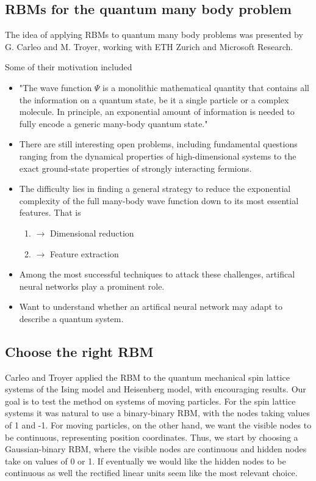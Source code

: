 \documentclass[%
oneside,                 %
final,                   %
10pt]{article}
\begin{document}
\subsection{RBMs for the quantum many body problem}

The idea of applying RBMs to quantum many body problems was presented by G. Carleo and M. Troyer, working with ETH Zurich and Microsoft Research.

Some of their motivation included

\begin{itemize}
\item "The wave function $\Psi$ is a monolithic mathematical quantity that contains all the information on a quantum state, be it a single particle or a complex molecule. In principle, an exponential amount of information is needed to fully encode a generic many-body quantum state."

\item There are still interesting open problems, including fundamental questions ranging from the dynamical properties of high-dimensional systems to the exact ground-state properties of strongly interacting fermions.

\item The difficulty lies in finding a general strategy to reduce the exponential complexity of the full many-body wave function down to its most essential features. That is
\begin{enumerate}

\item $\rightarrow$ Dimensional reduction

\item $\rightarrow$ Feature extraction

\end{enumerate}

\noindent
\item Among the most successful techniques to attack these challenges, artifical neural networks play a prominent role.

\item Want to understand whether an artifical neural network may adapt to describe a quantum system.
\end{itemize}

\noindent
\subsection{Choose the right RBM}

Carleo and Troyer applied the RBM to the quantum mechanical spin lattice systems of the Ising model and Heisenberg model, with encouraging results. Our goal is to test the method on systems of moving particles. For the spin lattice systems it was natural to use a binary-binary RBM, with the nodes taking values of 1 and -1. For moving particles, on the other hand, we want the visible nodes to be continuous, representing position coordinates. Thus, we start by choosing a Gaussian-binary RBM, where the visible nodes are continuous and hidden nodes take on values of 0 or 1. If eventually we would like the hidden nodes to be continuous as well the rectified linear units seem like the most relevant choice.
\end{document}
